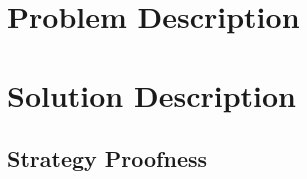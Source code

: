 \documentclass[mnsc,blindrev]{informs3}
\begin{document}
%


\section{Problem Description}



\section{Solution Description}



\subsection{Strategy Proofness}
\end{document}
